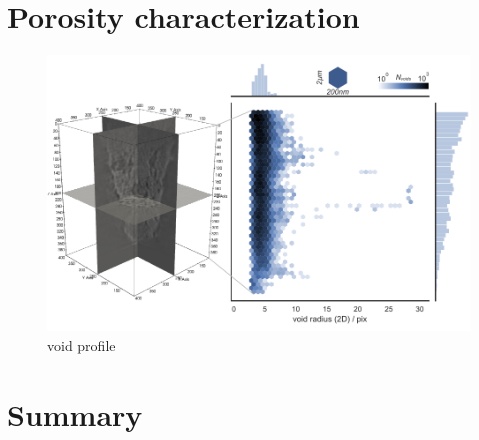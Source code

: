\documentclass[12pt]{scrartcl}
\newcommand{\myscale}{1}
\begin{document}

\section{Porosity characterization}\label{sec: porosity characterization}

\renewcommand{\myscale}{1.0}
\begin{figure}
\centering
\includegraphics[scale=\myscale]{void_profile}
\caption{
void profile
}\label{fig: void profile}
\end{figure}

\section{Summary}\label{sec: summary}
\end{document}
